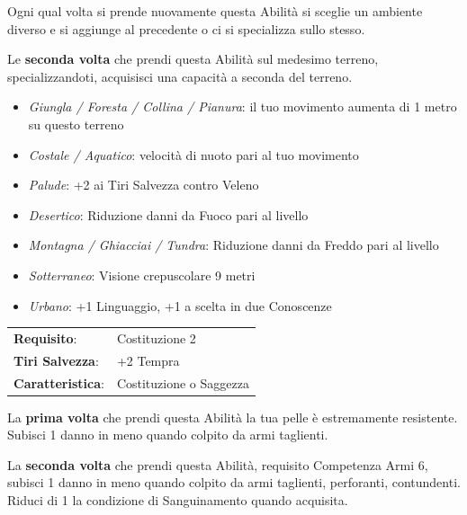 \begin{multicols}{2}
\medskip

Ogni qual volta si prende nuovamente questa Abilità si sceglie un ambiente diverso e si aggiunge al precedente o ci si specializza sullo stesso.

Le \textbf{seconda volta} che prendi questa Abilità sul medesimo terreno, specializzandoti, acquisisci una capacità a seconda del terreno.

\begin{itemize}[leftmargin=*] \setlength{\itemsep}{0pt}

\item \emph{Giungla / Foresta / Collina / Pianura}: il tuo movimento aumenta di 1 metro su questo terreno

\item \emph{Costale / Aquatico}: velocità di nuoto pari al tuo movimento

\item \emph{Palude}: +2 ai Tiri Salvezza contro Veleno

\item \emph{Desertico}: Riduzione danni da Fuoco pari al livello

\item \emph{Montagna / Ghiacciai / Tundra}: Riduzione danni da Freddo pari al livello

\item \emph{Sotterraneo}: Visione crepuscolare 9 metri

\item \emph{Urbano}: +1 Linguaggio, +1 a scelta in due Conoscenze

\end{itemize}

\noindent\begin{tabularx}{\linewidth}{>{\raggedright\arraybackslash}p{2.5cm}X}
\rowcolor{gray!20}\textbf{Requisito}: & Costituzione 2\\
\textbf{Tiri Salvezza}: & +2 Tempra\\
\rowcolor{gray!20}\textbf{Caratteristica}: & Costituzione o Saggezza\\
\end{tabularx}\smallskip

La \textbf{prima volta} che prendi questa Abilità la tua pelle è estremamente resistente. Subisci 1 danno in meno quando colpito da armi taglienti.

La \textbf{seconda volta} che prendi questa Abilità, requisito Competenza Armi 6, subisci 1 danno in meno quando colpito da armi taglienti, perforanti, contundenti. Riduci di 1 la condizione di Sanguinamento quando acquisita.


\end{multicols}
